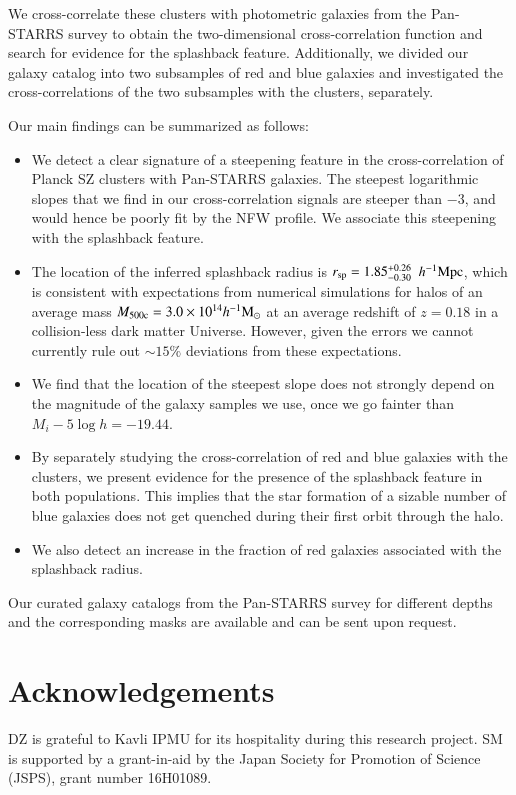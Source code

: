 \documentclass[iop, apjl, twocolappendix, numberedappendix]{emulateapj}
\def\mpch{h^{-1}{\rm Mpc}}
\def\msunh{h^{-1}{\rm M_{\odot}}}
\begin{document}
We cross-correlate these clusters with photometric galaxies from the
Pan-STARRS survey to obtain the two-dimensional cross-correlation
function and search for evidence for the splashback feature.
Additionally, we divided our galaxy catalog into two subsamples of
red and blue galaxies and investigated the cross-correlations of the
two subsamples with the clusters, separately.

Our main findings can be summarized as follows:
\begin{itemize}
\item We detect a clear signature of a steepening feature in the
cross-correlation of Planck SZ clusters with Pan-STARRS
galaxies. The steepest logarithmic slopes that we find in our cross-correlation
signals are steeper than $-3$, and would hence be poorly fit by the
NFW profile. We associate this steepening with the splashback feature.
\item The location of the inferred splashback radius is $r_{\rm
sp}=1.85_{-0.30}^{+0.26}$ $\mpch$, which is consistent with expectations
from numerical simulations for
halos of an average mass $M_{\rm 500c}=3.0\times10^{14}\msunh$ at an
average redshift of $z=0.18$ in a collision-less dark matter Universe. 
However, given the errors we cannot
currently rule out $\sim15\%$ deviations from these expectations.
\item We find that the location of the steepest slope does not
strongly depend on the magnitude of the galaxy samples we use, once
we go fainter than $M_i-5\log h=-19.44$.
\item By separately studying the cross-correlation of red and blue
galaxies with the clusters, we present evidence for the presence of
the splashback feature in both populations. This implies that the
star formation of a sizable number of blue galaxies does not get
quenched during their first orbit through the halo.
\item We also detect an increase in the fraction of red
galaxies associated with the splashback radius. 
\end{itemize}

Our curated galaxy catalogs from the Pan-STARRS survey for different
depths and the corresponding masks are available and can be sent
upon request.

\section*{Acknowledgements}
DZ is grateful to Kavli IPMU for its hospitality during this
research project. SM is supported by a grant-in-aid by the Japan
Society for Promotion of Science (JSPS), grant number 16H01089.
\end{document}
